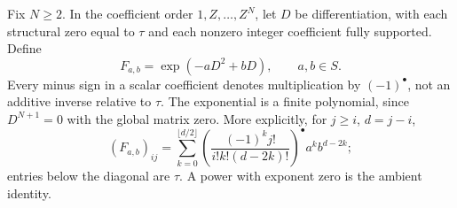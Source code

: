 \documentclass[11pt,a4paper]{article}
\theoremstyle{definition}\newtheorem{definition}[theorem]{Definition}
\begin{document}
Fix $N\ge2$. In the coefficient order $1,Z,\ldots,Z^N$, let $D$ be differentiation, with each structural zero equal to $\tau$ and each nonzero integer coefficient fully supported. Define
\begin{equation}
 F_{a,b}=\exp(-aD^2+bD),\qquad a,b\in S.             \tag{ST2}\label{ST2}
\end{equation}
Every minus sign in a scalar coefficient denotes multiplication by $(-1)^\bullet$, not an additive inverse relative to $\tau$. The exponential is a finite polynomial, since $D^{N+1}=0$ with the global matrix zero. More explicitly, for $j\ge i$, $d=j-i$,
\begin{equation}
 (F_{a,b})_{ij}=
 \sum_{k=0}^{\lfloor d/2\rfloor}
 \left(\frac{(-1)^k j!}{i!k!(d-2k)!}\right)^\bullet
 a^k b^{d-2k};                                     \tag{ST3}\label{ST3}
\end{equation}
entries below the diagonal are $\tau$. A power with exponent zero is the ambient identity.
\end{document}
